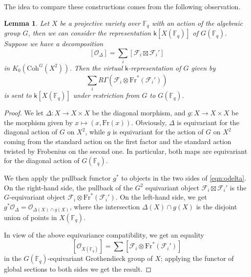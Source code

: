 \documentclass{amsart}
\newtheorem{lemma}[thm]{Lemma}
\theoremstyle{definition}
\begin{document}
The idea to compare these constructions comes from the following observation.
\begin{lemma}\label{lem:diagonal}
    Let $X$ be a projective variety over $\mathbb{F}_q$ with an action of the algebraic group $G$, then we can consider the representation $\mathsf{k}[X(\mathbb{F}_q)]$ of $G(\mathbb{F}_q)$. Suppose we have a decomposition
    \begin{equation}\label{eqn:odelta}
        [\mathcal{O}_\Delta] = \sum_i [\mathcal{F}_i\boxtimes \mathcal{F}_i']
    \end{equation}
    in $K_0(\mathrm{Coh}^G(X^2))$. Then the virtual $\mathsf{k}$-representation of $G$ given by
    \begin{equation}\label{eqn:virtualcoh}
        \sum_i R\Gamma(\mathcal{F}_i \otimes \mathrm{Fr}^*(\mathcal{F}_i'))
    \end{equation}
    is sent to $\mathsf{k}[X(\mathbb{F}_q)]$ under restriction from $G$ to $G(\mathbb{F}_q)$.
\end{lemma}
\begin{proof}
    We let $\Delta \colon  X \to X\times X$ be the diagonal morphism, and $g \colon  X \to X\times X$ be the morphism given by $x \mapsto (x, \mathrm{Fr}(x))$. Obviously, $\Delta$ is equivariant for the diagonal action of $G$ on $X^2$, while $g$  is equivariant for the action of $G$ on $X^2$
    coming from the standard action on the first factor and the standard action twisted by Frobenius on the second one. In particular, both maps
    are equivariant for the diagonal action of $G(\mathbb{F}_q)$.
    
    We then apply the pullback functor $g^*$ to objects in the two sides of \eqref{eqn:odelta}. On the right-hand side, 
    the pullback of the $G^2$ equivariant object $\mathcal{F}_i\boxtimes \mathcal{F}_i'$ is the $G$-equivariant object
    $\mathcal{F}_i \otimes \mathrm{Fr}^*(\mathcal{F}_i').$
    On the left-hand side, we get $g^*\mathcal{O}_\Delta =\mathcal{O}_{\Delta(X)\cap g(X)}$, 
    where the intersection $\Delta(X)\cap g(X)$ is the disjoint union of points in $X(\mathbb{F}_q)$.

    In view of the above equivariance compatibility, we get an equality
    $$[\mathcal{O}_{X({\mathbb F}_q)} ] =\sum [\mathcal{F}_i\otimes \mathrm{Fr}^*(\mathcal{F}_i')]$$
    in the $G(\mathbb{F}_q)$-equivariant Grothendieck group of $X$; applying the functor of global sections to both sides we get the result. 
\end{proof}
\end{document}
